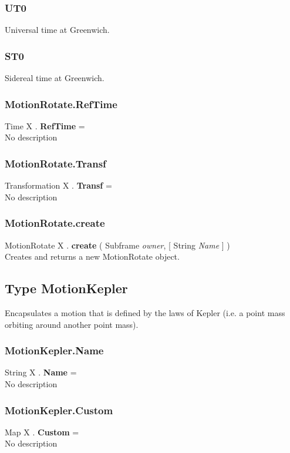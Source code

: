 \documentclass[10pt]{book}
\begin{document}
\subsubsection{UT0 \label{T:TimeType|UT0}}
Universal time at Greenwich.

\subsubsection{ST0 \label{T:TimeType|ST0}}
Sidereal time at Greenwich.

\subsubsection{MotionRotate.RefTime \label{F:MotionRotate:RefTime}}
Time X . \textbf{RefTime} = \\
No description

\subsubsection{MotionRotate.Transf \label{F:MotionRotate:Transf}}
Transformation X . \textbf{Transf} = \\
No description

\subsubsection{MotionRotate.create \label{F:MotionRotate:create}}
MotionRotate X . \textbf{create} ( Subframe \textit{owner},  [ String \textit{Name} ] ) \\
Creates and returns a new MotionRotate object.

\subsection{Type MotionKepler \label{T:MotionKepler}}
Encapsulates a motion that is defined by the laws of Kepler (i.e. a point mass orbiting around another point mass).

\subsubsection{MotionKepler.Name \label{F:MotionKepler:Name}}
String X . \textbf{Name} = \\
No description

\subsubsection{MotionKepler.Custom \label{F:MotionKepler:Custom}}
Map X . \textbf{Custom} = \\
No description
\end{document}
